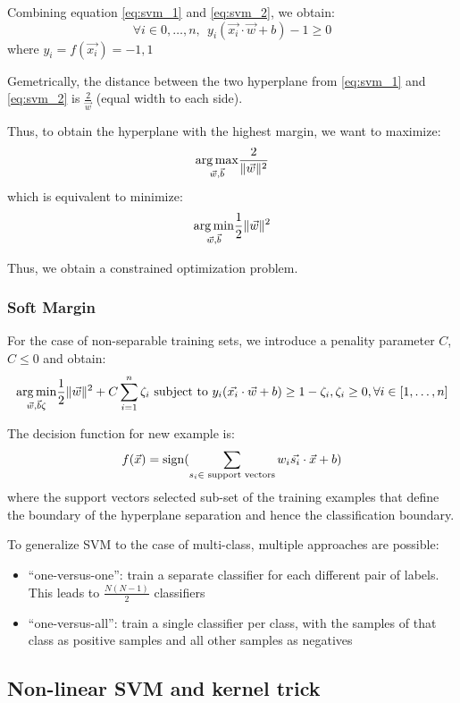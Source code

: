 Combining equation \ref{eq:svm_1} and \ref{eq:svm_2}, we obtain:
$$ \forall i \in {0, \ldots, n}, ~~ y_i (\vec{x_i} \cdot \vec{w} + b) - 1 \geq 0$$
where $y_i = f(\vec{x_i}) = {-1, 1}$

Gemetrically, the distance between the two hyperplane from \ref{eq:svm_1} and \ref{eq:svm_2} is $\frac{2}{\vec{w}}$ (equal width to each side).

Thus, to obtain the hyperplane with the highest margin, we want to maximize:
$$ \underset {\vec{w}, \vec{b}}{\operatorname {arg\,max}} \frac{2}{\lVert \vec{w} \rVert^2} $$
which is equivalent to minimize:
$$ \underset {\vec{w}, \vec{b}}{\operatorname {arg\,min}} \frac{1}{2} \lVert \vec{w} \rVert^2 $$

Thus, we obtain a constrained optimization problem.

\subsubsection{Soft Margin}

For the case of non-separable training sets, we introduce a penality parameter $C$, $C \leq 0$ and obtain:
$$
\underset {\vec{w}, \vec{b} \zeta}{\operatorname {arg\,min}} \frac{1}{2} \lVert \vec{w} \rVert^2 + C \sum_{i = 1}^{n} \zeta_i
\text{ subject to } y_i (\vec{x_i} \cdot \vec{w} + b) \geq 1 - \zeta_i, \zeta_i \geq 0, \forall i \in [1, \ldots, n]
$$

The decision function for new example is:
$$
f(\vec{x}) = \operatorname {sign} (\sum_{s_i \in \text{ support vectors}} w_i \vec{s_i} \cdot \vec{x} + b)
$$
where the support vectors selected sub-set of the training  examples that define the boundary of the hyperplane separation and hence the classification boundary.

To generalize SVM to the case of multi-class, multiple approaches are possible:
\begin{itemize}
    \item \enquote{one-versus-one}: train a separate classifier for each different pair of labels. This leads to $\frac{N (N - 1)}{2}$ classifiers
    \item \enquote{one-versus-all}: train a single classifier per class, with the samples of that class as positive samples and all other samples as negatives
\end{itemize}

\subsection{Non-linear SVM and kernel trick}

